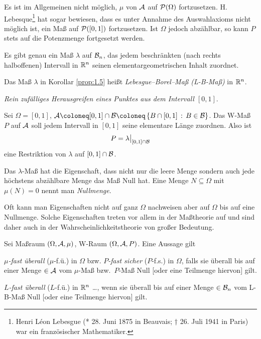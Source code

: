 \begin{bem}
\label{bem:1.4}
Es ist im Allgemeinen nicht möglich, $\mu$ von $\AA$ auf ${\PP}(\Omega)$
fortzusetzen. H. Lebesque\footnote{
Henri Léon Lebesgue (* 28. Juni 1875 in Beauvais; † 26.
Juli 1941 in Paris) war ein französischer Mathematiker.
}
hat sogar bewiesen, dass es unter Annahme des
Auswahlaxioms nicht möglich ist, ein Maß auf $\PP([0,1])$ fortzusetzen. Ist
$\Omega$ jedoch abzählbar, so kann $P$ stets auf die Potenzmenge fortgesetzt
werden.\maphere
\end{bem}

\begin{prop}[Korollar]
\label{prop:1.5}
Es gibt genau ein Maß $\lambda$ auf $\BB_n$, das jedem
beschränkten (nach rechts halboffenen) Intervall in $\R^n$ seinen
elementargeometrischen Inhalt zuordnet.\fishhere
\end{prop}

\begin{defn}
\label{defn:1.8}
Das Maß $\lambda$ in Korollar \ref{prop:1.5} heißt \emph{Lebesgue--Borel--Maß
(L-B-Maß)} in $\R^n$.\fishhere
\end{defn}

\begin{bsp}
\label{bsp:1.5}
\textit{Rein zufälliges Herausgreifen eines Punktes aus dem Intervall $[0,1]$}.

Sei $\Omega=[0,1]$, $\AA\defl[0,1]\cap\BB\defl\setdef{B\cap[0,1]}{B\in\BB}$.
Das W-Maß $P$ auf $\AA$ soll jedem Intervall in $[0,1]$ seine elementare Länge
zuordnen. Also ist
\begin{align*}
P=\lambda\big|_{[0,1]\cap\BB}
\end{align*}
eine Restriktion von $\lambda$ auf $[0,1]\cap\BB$.\bsphere
\end{bsp}

Das $\lambda$-Maß hat die Eigenschaft, dass nicht nur die leere Menge
sondern auch jede höchstens abzählbare Menge das Maß Null hat. Eine Menge
$N\subseteq \Omega$ mit $\mu(N)=0$ nennt man \emph{Nullmenge}.

Oft kann man Eigenschaften nicht auf ganz $\Omega$ nachweisen aber auf
$\Omega$ bis auf eine Nullmenge. Solche Eigenschaften treten vor allem in der
Maßtheorie auf und sind daher auch in der Wahrscheinlichkeitstheorie von großer
Bedeutung.

\begin{defnn}
Sei Maßraum $(\Omega, \AA, \mu )$, W-Raum $(\Omega, {\AA},P)$. Eine Aussage
gilt
\begin{defnenum}
  \item \emph{$\mu$-fast überall} ($\mu$-f.ü.) in $\Omega$ bzw. \emph{$P$-fast
sicher} ($P$-f.s.) in $\Omega$, falls sie überall bis auf einer Menge $\in
{\AA}$ vom $\mu$-Maß bzw.\ $P$-Maß Null [oder eine Teilmenge hiervon] gilt.
\item \emph{$L$-fast überall} ($L$-f.ü.) in $\R^{n}$ \ldots, wenn sie
überall bis auf einer Menge $\in \BB_{n}$ vom L-B-Maß Null [oder eine Teilmenge
hiervon] gilt.\fishhere   
\end{defnenum}
\end{defnn}

